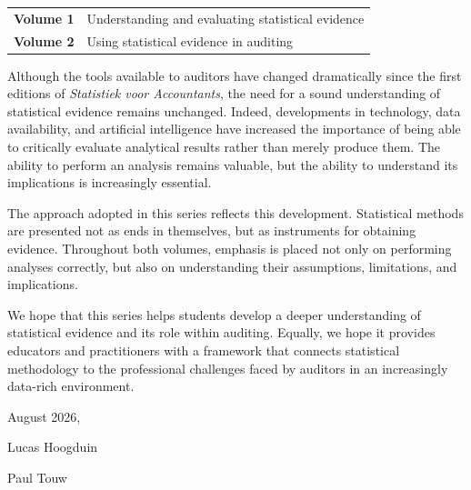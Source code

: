 \begin{center}
\begin{tabular}{l l}
\textbf{Volume 1} & Understanding and evaluating statistical evidence \\
\textbf{Volume 2} & Using statistical evidence in auditing
\end{tabular}
\end{center}

Although the tools available to auditors have changed dramatically since the first editions of \emph{Statistiek voor Accountants}, the need for a sound understanding of statistical evidence remains unchanged. Indeed, developments in technology, data availability, and artificial intelligence have increased the importance of being able to critically evaluate analytical results rather than merely produce them. The ability to perform an analysis remains valuable, but the ability to understand its implications is increasingly essential.

The approach adopted in this series reflects this development. Statistical methods are presented not as ends in themselves, but as instruments for obtaining evidence. Throughout both volumes, emphasis is placed not only on performing analyses correctly, but also on understanding their assumptions, limitations, and implications.

We hope that this series helps students develop a deeper under\-standing of statistical evidence and its role within auditing. Equally, we hope it provides educators and practitioners with a framework that connects statistical methodology to the professional challenges faced by auditors in an increasingly data-rich environment.

\bigskip
August 2026,

Lucas Hoogduin

Paul Touw